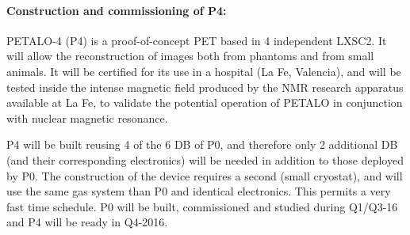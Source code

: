 \paragraph{Construction and commissioning of P4:}
%

PETALO-4 (P4) is a proof-of-concept PET based in 4 independent LXSC2. It will allow the reconstruction of images both from phantoms and from small animals. It will be certified for its use in a hospital (La Fe, Valencia), and will be tested inside the intense magnetic field produced by the NMR research apparatus available at La Fe, to validate the potential operation of PETALO in conjunction with nuclear magnetic resonance.  


P4 will be built reusing 4 of the 6 DB of P0, and therefore only 2 additional DB (and their corresponding electronics) will be needed in addition to those deployed by P0. The construction of the device requires a second (small cryostat), and will use the same gas system than P0 and identical electronics. This permits a very fast time schedule. P0 will be built, commissioned and studied during Q1/Q3-16 and P4 will be ready in Q4-2016. 

% 

